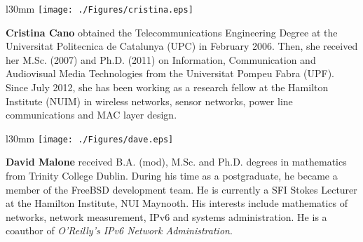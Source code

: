 \documentclass[preprint,12pt]{elsarticle}
\begin{document}



\vspace{1cm}

\begin{wrapfigure}{l}{30mm}
    \texttt{[image: ./Figures/cristina.eps]}
\end{wrapfigure}
\textbf{Cristina Cano} obtained the Telecommunications Engineering Degree at the Universitat Politecnica de Catalunya (UPC) in February 2006. Then, she received her M.Sc. (2007) and Ph.D. (2011) on Information, Communication and Audiovisual Media Technologies from the Universitat Pompeu Fabra (UPF). Since July 2012, she has been working as a research fellow at the Hamilton Institute (NUIM) in wireless networks, sensor networks, power line communications and MAC layer design.\\


\begin{wrapfigure}{l}{30mm}
    \texttt{[image: ./Figures/dave.eps]}
\end{wrapfigure}
\textbf{David Malone} received B.A. (mod), M.Sc. and Ph.D. degrees in mathematics from Trinity College Dublin. During his time as a postgraduate, he became a member of the FreeBSD development team. He is currently a SFI Stokes Lecturer at the Hamilton Institute, NUI Maynooth. His interests include mathematics of networks, network measurement, IPv6 and systems administration. He is a coauthor of \emph{O'Reilly's IPv6 Network Administration}.
\end{document}
